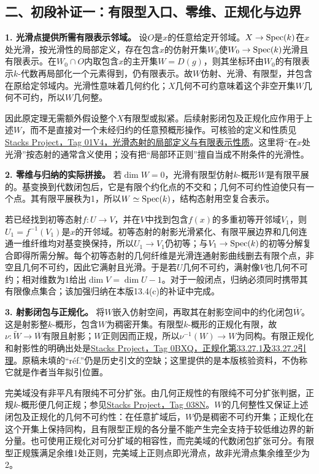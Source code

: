 \subsection*{二、初段补证一：有限型入口、零维、正规化与边界}

\noindent\textbf{1. 光滑点提供所需有限表示邻域。}
设$O$是$x$的任意给定开邻域。$X\to\operatorname{Spec}(k)$在$x$处光滑，按光滑性的局部定义，存在包含$x$的仿射开集$W_0$使$W_0\to\operatorname{Spec}(k)$光滑且有限表示。在$W_0\cap O$内取包含$x$的主开集$W=D(g)$，则其坐标环由$W_0$的有限表示$k$-代数再局部化一个元素得到，仍有限表示。故$W$仿射、光滑、有限型，并包含在原给定邻域内。光滑性意味着几何约化；$X$几何不可约意味着这个非空开集$W$几何不可约，所以$W$几何整。

因此原定理无需额外假设整个$X$有限型或拟紧。后续射影闭包及正规化应作用于上述$W$，而不是直接对一个未经归约的任意预概形操作。可核验的定义和性质见\href{https://stacks.math.columbia.edu/tag/01V4}{Stacks Project，Tag 01V4，光滑态射的局部定义与有限表示性质}。这里将“在$x$处光滑”按态射的通常含义使用；没有把“局部环正则”擅自当成不附条件的光滑性。

\noindent\textbf{2. 零维与归纳的实际拼接。}
若$\dim W=0$，光滑有限型仿射$k$-概形$W$是有限平展的。基变换到代数闭包后，它是有限个约化点的不交和；几何不可约性迫使只有一个点。其有限平展秩为1，所以$W\simeq\operatorname{Spec}(k)$，结构态射用空复合表示。

若已经找到初等态射$f:U\to V$，并在$V$中找到包含$f(x)$的多重初等开邻域$V_1$，则$U_1=f^{-1}(V_1)$是$x$的开邻域。初等态射的射影光滑紧化、有限平展边界和几何连通一维纤维均对基变换保持，所以$U_1\to V_1$仍初等；与$V_1\to\operatorname{Spec}(k)$的初等分解复合即得所需分解。每个初等态射的几何纤维是光滑连通射影曲线删去有限个点，非空且几何不可约，因此它满射且光滑。于是若$U$几何不可约，满射像$V$也几何不可约；相对维数为1给出$\dim V=\dim U-1$。对于一般闭点，归纳必须同时携带其有限像点集合；该加强归纳在本版13.4(c)的补证中完成。

\noindent\textbf{3. 射影闭包与正规化。}
将$W$嵌入仿射空间，再取其在射影空间中的约化闭包$\overline W$。这是射影整$k$-概形，包含$W$为稠密开集。有限型$k$-概形的正规化有限，故$\nu:\widetilde W\to\overline W$有限且射影；$W$正则因而正规，所以$\nu^{-1}(W)\to W$为同构。有限正规化和射影性的明确出处是\href{https://stacks.math.columbia.edu/tag/0BXQ}{Stacks Project，Tag 0BXQ，正规化第33.27.1及33.27.2引理}。原稿未填的“r\'ef.”仍是历史引文的空缺；这里提供的是本版核验资料，不伪称它就是作者当年拟引位置。

完美域没有非平凡有限纯不可分扩张。由几何正规性的有限纯不可分扩张判据，正规$k$-概形便几何正规；参见\href{https://stacks.math.columbia.edu/tag/038N}{Stacks Project，Tag 038N}。$W$的几何整性又保证上述闭包及正规化的几何不可约性：在任意扩域后，$W$仍是稠密不可约开集；正规化在这个开集上保持同构，且有限型正规的各分量不能产生完全支持于较低维边界的新分量。也可使用正规化对可分扩域的相容性，而完美域的代数闭包扩张可分。有限型正规簇满足余维1处正则，完美域上正则点即光滑点，故非光滑点集余维至少为2。


